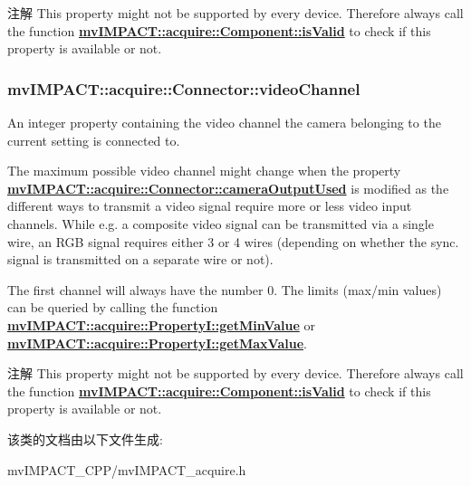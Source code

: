 \begin{DoxyNote}{注解}
This property might not be supported by every device. Therefore always call the function {\bfseries \hyperlink{classmv_i_m_p_a_c_t_1_1acquire_1_1_component_ac51e55e7e046101f3c6119d84123abd5}{mv\+I\+M\+P\+A\+C\+T\+::acquire\+::\+Component\+::is\+Valid}} to check if this property is available or not. 
\end{DoxyNote}
\hypertarget{classmv_i_m_p_a_c_t_1_1acquire_1_1_connector_a22c033da953a263629c4dcf410cfab30}{
\subsubsection[{video\+Channel}]{ mv\+I\+M\+P\+A\+C\+T\+::acquire\+::\+Connector\+::video\+Channel}}\label{classmv_i_m_p_a_c_t_1_1acquire_1_1_connector_a22c033da953a263629c4dcf410cfab30}


An integer property containing the video channel the camera belonging to the current setting is connected to. 

The maximum possible video channel might change when the property {\bfseries \hyperlink{classmv_i_m_p_a_c_t_1_1acquire_1_1_connector_aa9f92bb9609d1bfc1d0edd4c23cf7d2d}{mv\+I\+M\+P\+A\+C\+T\+::acquire\+::\+Connector\+::camera\+Output\+Used}} is modified as the different ways to transmit a video signal require more or less video input channels. While e.\+g. a composite video signal can be transmitted via a single wire, an R\+G\+B signal requires either 3 or 4 wires (depending on whether the sync. signal is transmitted on a separate wire or not).

The first channel will always have the number 0. The limits (max/min values) can be queried by calling the function {\bfseries \hyperlink{classmv_i_m_p_a_c_t_1_1acquire_1_1_enum_property_i_a906741ebe9a9f23d56416af0bc788485}{mv\+I\+M\+P\+A\+C\+T\+::acquire\+::\+Property\+I\+::get\+Min\+Value}} or {\bfseries \hyperlink{classmv_i_m_p_a_c_t_1_1acquire_1_1_enum_property_i_ad0697983e878d4195ef6414d837e3212}{mv\+I\+M\+P\+A\+C\+T\+::acquire\+::\+Property\+I\+::get\+Max\+Value}}.

\begin{DoxyNote}{注解}
This property might not be supported by every device. Therefore always call the function {\bfseries \hyperlink{classmv_i_m_p_a_c_t_1_1acquire_1_1_component_ac51e55e7e046101f3c6119d84123abd5}{mv\+I\+M\+P\+A\+C\+T\+::acquire\+::\+Component\+::is\+Valid}} to check if this property is available or not. 
\end{DoxyNote}


该类的文档由以下文件生成\+:\begin{DoxyCompactItemize}
\item 
mv\+I\+M\+P\+A\+C\+T\+\_\+\+C\+P\+P/mv\+I\+M\+P\+A\+C\+T\+\_\+acquire.\+h\end{DoxyCompactItemize}
